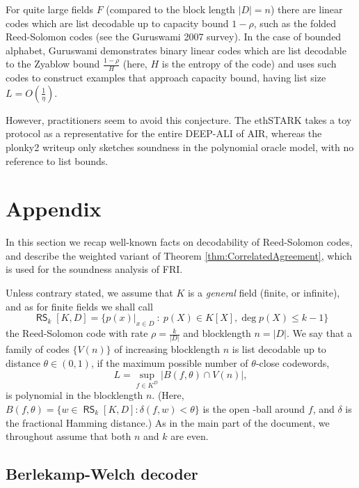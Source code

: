 \documentclass[11pt,article,oneside]{memoir}
\theoremstyle{definition}
\theoremstyle{remark}
\DeclareMathOperator{\RS}{\mathsf{RS}}
\begin{document}
For quite large fields $F$ (compared to the block length $|D|=n$) there are linear codes which are list decodable up to capacity bound $1-\rho$, such as the folded Reed-Solomon codes (see the Guruswami 2007 survey). 
In the case of bounded alphabet, Guruswami \cite{ListDecodingBook} demonstrates binary linear codes which are list decodable to the Zyablow bound $\frac{1-\rho}{H}$ (here, $H$ is the entropy of the code) and uses such codes to construct examples that approach capacity bound, having list size $L=O\left(\frac{1}{\eta}\right)$. 

However, practitioners seem to avoid this conjecture. 
The ethSTARK \cite{ethSTARK} takes a toy protocol as a representative for the entire DEEP-ALI of AIR, whereas the plonky2 writeup \cite{PolygonZero} only sketches soundness in the polynomial oracle model, with no reference to list bounds.






\appendix
\newpage
\chapter{Appendix}
\label{s:Appendix}

In this section we recap well-known facts on decodability of Reed-Solomon codes\footnotemark, and describe the weighted variant of Theorem \ref{thm:CorrelatedAgreement}, which is used for the soundness analysis of FRI.

Unless contrary stated, we assume that $K$ is a \textit{general} field (finite, or infinite), and as for finite fields we shall call
\[ 
\RS_k[K,D]=\big\{p(x)|_{x\in D} \: :\: p(X)\in K[X], \deg p(X)\leq k-1 \big\}
\]
the Reed-Solomon code with rate $\rho=\frac{k}{|D|}$ and blocklength $n=|D|$. 
We say that a family of codes $\{V(n)\}$ of increasing blocklength $n$ is list decodable up to distance $\theta\in (0,1)$, if the maximum possible number of $\theta$-close codewords,
\[
L = \sup_{f\in K^D} \big| B(f,\theta)\cap V(n) \big|,
\]
is polynomial in the blocklength $n$. 
(Here,  $B(f,\theta)= \{w\in \RS_k[K,D] : \delta(f,w)< \theta\}$
 is the open -ball around $f$, and $\delta$ is the fractional Hamming distance.)   
As in the main part of the document, we throughout assume that both $n$ and $k$ are even.

\section{Berlekamp-Welch decoder}
\end{document}
